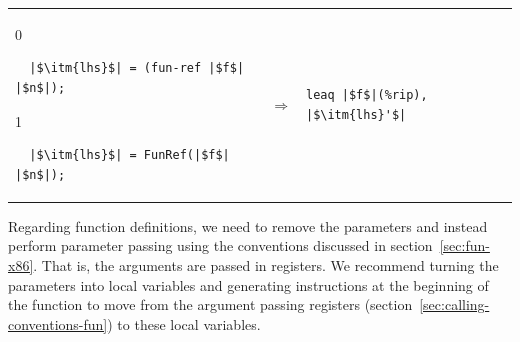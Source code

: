 \documentclass[7x10]{TimesAPriori_MIT}%
\def\racketEd{0}
\def\pythonEd{1}
\def\edition{0}
\numberwithin{theorem}{chapter}
\numberwithin{definition}{chapter}
\numberwithin{equation}{chapter}
\begin{document}
\begin{center}
  \begin{tabular}{lcl}
\begin{minipage}{0.35\textwidth}
{\if\edition\racketEd
\begin{lstlisting}
  |$\itm{lhs}$| = (fun-ref |$f$| |$n$|);
\end{lstlisting}
\fi}
{\if\edition\pythonEd
\begin{lstlisting}
  |$\itm{lhs}$| = FunRef(|$f$| |$n$|);
\end{lstlisting}
\fi}
\end{minipage}
&
$\Rightarrow$\qquad\qquad
&
\begin{minipage}{0.3\textwidth}
\begin{lstlisting}
leaq |$f$|(%rip), |$\itm{lhs}'$|
\end{lstlisting}
\end{minipage}
  \end{tabular}
\end{center}


Regarding function definitions, we need to remove the parameters and
instead perform parameter passing using the conventions discussed in
section~\ref{sec:fun-x86}. That is, the arguments are passed in
registers. We recommend turning the parameters into local variables
and generating instructions at the beginning of the function to move
from the argument passing registers
(section~\ref{sec:calling-conventions-fun}) to these local variables.
\end{document}
